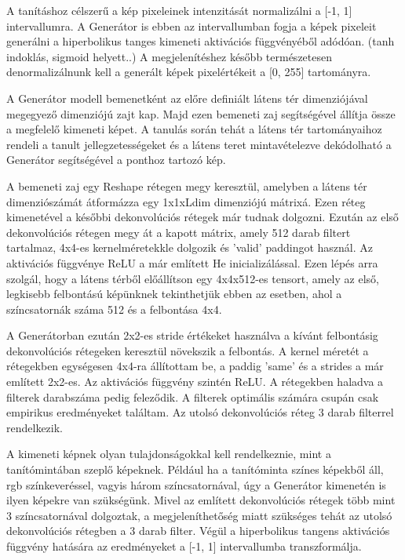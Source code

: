 A tanításhoz célszerű a kép pixeleinek intenzitását normalizálni a [-1, 1] intervallumra. A Generátor is ebben az intervallumban fogja a képek pixeleit generálni a hiperbolikus tanges kimeneti aktivációs függvényéből adódóan. (tanh indoklás, sigmoid helyett..) A megjelenítéshez később természetesen denormalizálnunk kell a generált képek pixelértékeit a [0, 255] tartományra.

A Generátor modell bemenetként az előre definiált látens tér dimenziójával megegyező dimenziójú zajt kap. Majd ezen bemeneti zaj segítségével állítja össze a megfelelő kimeneti képet. A tanulás során tehát a látens tér tartományaihoz rendeli a tanult jellegzetességeket és a látens teret mintavételezve dekódolható a Generátor segítségével a ponthoz tartozó kép.

A bemeneti zaj egy Reshape rétegen megy keresztül, amelyben a látens tér dimenziószámát átformázza egy 1x1xLdim dimenziójú mátrixá. Ezen réteg kimenetével a későbbi dekonvolúciós rétegek már tudnak dolgozni.
Ezután az első dekonvolúciós rétegen megy át a kapott mátrix, amely 512 darab filtert tartalmaz, 4x4-es kernelméretekkle dolgozik és 'valid' paddingot használ. Az aktivációs függvénye ReLU a már említett He inicializálással. Ezen lépés arra szolgál, hogy a látens térből előállítson egy 4x4x512-es tensort, amely az első, legkisebb felbontású képünknek tekinthetjük ebben az esetben, ahol a színcsatornák száma 512 és a felbontása 4x4.

A Generátorban ezután 2x2-es stride értékeket használva a kívánt felbontásig dekonvolúciós rétegeken keresztül növekszik a felbontás. A kernel méretét a rétegekben egységesen 4x4-ra állítottam be, a paddig 'same' és a strides a már említett 2x2-es. Az aktivációs függvény szintén ReLU. A rétegekben haladva a filterek darabszáma pedig feleződik. A filterek optimális számára csupán csak empirikus eredményeket találtam. Az utolsó dekonvolúciós réteg 3 darab filterrel rendelkezik.

A kimeneti képnek olyan tulajdonságokkal kell rendelkeznie, mint a tanítómintában szeplő képeknek. Például ha a tanítóminta színes képekből áll, rgb színkeveréssel, vagyis három színcsatornával, úgy a Generátor kimenetén is ilyen képekre van szükségünk. Mivel az említett dekonvolúciós rétegek több mint 3 színcsatornával dolgoztak, a megjeleníthetőség miatt szükséges tehát az utolsó dekonvolúciós rétegben a 3 darab filter.
Végül a hiperbolikus tangens aktivációs függvény hatására az eredményeket a [-1, 1] intervallumba transzformálja.

